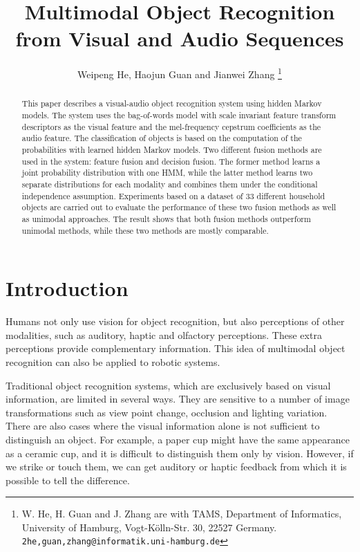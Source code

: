 \documentclass[letterpaper, 10 pt, conference]{ieeeconf}
\title{\LARGE \bf
Multimodal Object Recognition from Visual and Audio Sequences%
}
\author{Weipeng He, Haojun Guan and Jianwei Zhang%
\thanks{W. He, H. Guan and J. Zhang are with TAMS, Department of Informatics, University of Hamburg, Vogt-K\"olln-Str. 30, 22527 Germany. {\tt\small 2he,guan,zhang@informatik.uni-hamburg.de}}%
}
\begin{document}
\maketitle
\thispagestyle{empty}
\pagestyle{empty}

\begin{abstract}
This paper describes a visual-audio object recognition system using hidden Markov models. The system uses the bag-of-words model with scale invariant feature transform descriptors as the visual feature and the mel-frequency cepstrum coefficients as the audio feature. The classification of objects is based on the computation of the probabilities with learned hidden Markov models. Two different fusion methods are used in the system: feature fusion and decision fusion. The former method learns a joint probability distribution with one HMM, while the latter method learns two separate distributions for each modality and combines them under the conditional independence assumption. Experiments based on a dataset of 33 different household objects are carried out to evaluate the performance of these two fusion methods as well as unimodal approaches. The result shows that both fusion methods outperform unimodal methods, while these two methods are mostly comparable.
\end{abstract}

\section{Introduction}
Humans not only use vision for object recognition, but also perceptions of other modalities, such as auditory, haptic and olfactory perceptions. These extra perceptions provide complementary information. This idea of multimodal object recognition can also be applied to robotic systems.

Traditional object recognition systems, which are exclusively based on visual information, are limited in several ways. They are sensitive to a number of image transformations such as view point change, occlusion and lighting variation. There are also cases where the visual information alone is not sufficient to distinguish an object. For example, a paper cup might have the same appearance as a ceramic cup, and it is difficult to distinguish them only by vision. However, if we strike or touch them, we can get auditory or haptic feedback from which it is possible to tell the difference.
\end{document}
